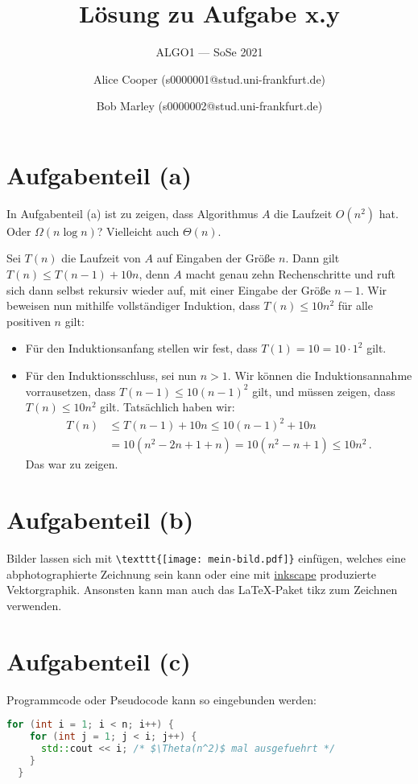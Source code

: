 \documentclass[a4paper,11pt,oneside]{scrartcl}
\subtitle{ALGO1 --- SoSe 2021}
\title{Lösung zu Aufgabe x.y}
\author{%
  Alice Cooper (s0000001@stud.uni-frankfurt.de)%
  \and Bob Marley (s0000002@stud.uni-frankfurt.de)%
}
\begin{document}
\maketitle

\section{Aufgabenteil (a)}%

In Aufgabenteil (a) ist zu zeigen, dass Algorithmus $A$ die Laufzeit $O(n^2)$ hat. Oder $\Omega(n\log n)$? Vielleicht auch $\Theta(n)$.

Sei $T(n)$ die Laufzeit von $A$ auf Eingaben der Größe $n$.
Dann gilt $T(n)\le T(n-1) + 10n$, denn $A$ macht genau zehn Rechenschritte und ruft sich dann selbst rekursiv wieder auf, mit einer Eingabe der Größe $n-1$. Wir beweisen nun mithilfe vollständiger Induktion, dass $T(n)\le 10n^2$ für alle positiven $n$ gilt:

\begin{itemize}
  \item Für den Induktionsanfang stellen wir fest, dass $T(1)=10=10 \cdot 1^2$ gilt.
  \item Für den Induktionsschluss, sei nun $n>1$. Wir können die Induktionsannahme vorrausetzen, dass $T(n-1)\le 10 (n-1)^2$ gilt, und müssen zeigen, dass $T(n)\le 10n^2$ gilt. Tatsächlich haben wir:
  \begin{align*}
    T(n) &\le T(n-1)+10n
    \le 10(n-1)^2 + 10n\\
    &= 10 (n^2-2n+1+n)
    = 10 (n^2-n+1) \le 10 n^2\,.
  \end{align*}
  Das war zu zeigen.
\end{itemize}

\section{Aufgabenteil (b)}

Bilder lassen sich mit \verb|\texttt{[image: mein-bild.pdf]}| einfügen, welches eine abphotographierte Zeichnung sein kann oder eine mit \href{https://inkscape.org/}{inkscape} produzierte Vektorgraphik. Ansonsten kann man auch das LaTeX-Paket tikz zum Zeichnen verwenden.

\section{Aufgabenteil (c)}

Programmcode oder Pseudocode kann so eingebunden werden:
\begin{lstlisting}[language=C++]
  for (int i = 1; i < n; i++) {
    for (int j = 1; j < i; j++) {
      std::cout << i; /* $\Theta(n^2)$ mal ausgefuehrt */
    }
  }
\end{lstlisting}
\end{document}

